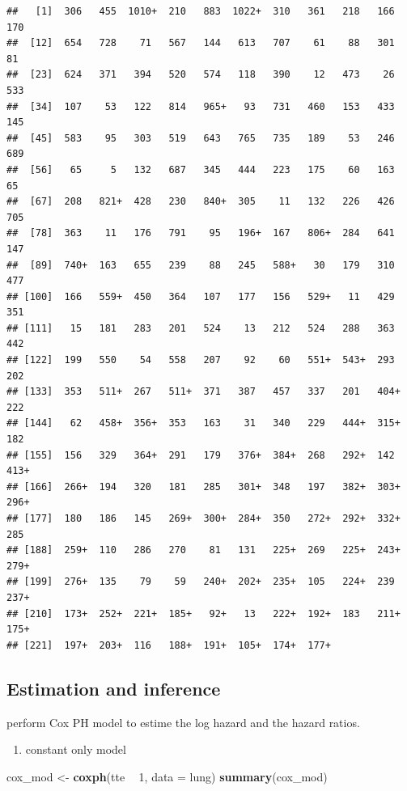 \documentclass[]{book}
\newenvironment{Shaded}{\begin{snugshade}}{\end{snugshade}}
\newcommand{\KeywordTok}[1]{\textcolor[rgb]{0.13,0.29,0.53}{\textbf{#1}}}
\newcommand{\DataTypeTok}[1]{\textcolor[rgb]{0.13,0.29,0.53}{#1}}
\newcommand{\DecValTok}[1]{\textcolor[rgb]{0.00,0.00,0.81}{#1}}
\newcommand{\StringTok}[1]{\textcolor[rgb]{0.31,0.60,0.02}{#1}}
\newcommand{\OperatorTok}[1]{\textcolor[rgb]{0.81,0.36,0.00}{\textbf{#1}}}
\newcommand{\NormalTok}[1]{#1}
\providecommand{\tightlist}{%
  \setlength{\itemsep}{0pt}\setlength{\parskip}{0pt}}
\theoremstyle{definition}
\theoremstyle{definition}
\theoremstyle{remark}
\begin{document}
\begin{verbatim}
##   [1]  306   455  1010+  210   883  1022+  310   361   218   166   170 
##  [12]  654   728    71   567   144   613   707    61    88   301    81 
##  [23]  624   371   394   520   574   118   390    12   473    26   533 
##  [34]  107    53   122   814   965+   93   731   460   153   433   145 
##  [45]  583    95   303   519   643   765   735   189    53   246   689 
##  [56]   65     5   132   687   345   444   223   175    60   163    65 
##  [67]  208   821+  428   230   840+  305    11   132   226   426   705 
##  [78]  363    11   176   791    95   196+  167   806+  284   641   147 
##  [89]  740+  163   655   239    88   245   588+   30   179   310   477 
## [100]  166   559+  450   364   107   177   156   529+   11   429   351 
## [111]   15   181   283   201   524    13   212   524   288   363   442 
## [122]  199   550    54   558   207    92    60   551+  543+  293   202 
## [133]  353   511+  267   511+  371   387   457   337   201   404+  222 
## [144]   62   458+  356+  353   163    31   340   229   444+  315+  182 
## [155]  156   329   364+  291   179   376+  384+  268   292+  142   413+
## [166]  266+  194   320   181   285   301+  348   197   382+  303+  296+
## [177]  180   186   145   269+  300+  284+  350   272+  292+  332+  285 
## [188]  259+  110   286   270    81   131   225+  269   225+  243+  279+
## [199]  276+  135    79    59   240+  202+  235+  105   224+  239   237+
## [210]  173+  252+  221+  185+   92+   13   222+  192+  183   211+  175+
## [221]  197+  203+  116   188+  191+  105+  174+  177+
\end{verbatim}

\subsection{Estimation and inference}\label{estimation-and-inference}

perform Cox PH model to estime the log hazard and the hazard ratios.

\begin{enumerate}
\def\labelenumi{\arabic{enumi}.}
\tightlist
\item
  constant only model
\end{enumerate}

\begin{Shaded}
\begin{Highlighting}[]
\NormalTok{cox_mod <-}\StringTok{ }\KeywordTok{coxph}\NormalTok{(tte }\OperatorTok{~}\StringTok{ }\DecValTok{1}\NormalTok{, }\DataTypeTok{data =}\NormalTok{ lung)}
\KeywordTok{summary}\NormalTok{(cox_mod)}
\end{Highlighting}
\end{Shaded}
\end{document}
